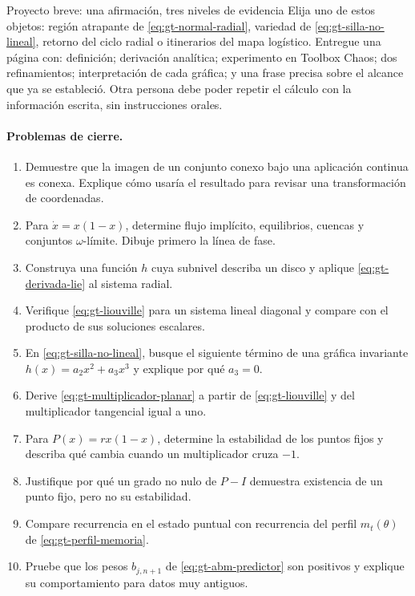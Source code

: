 \begin{activitybox}{Proyecto breve: una afirmación, tres niveles de evidencia}
Elija uno de estos objetos: región atrapante de \eqref{eq:gt-normal-radial}, variedad
de \eqref{eq:gt-silla-no-lineal}, retorno del ciclo radial o itinerarios del mapa
logístico. Entregue una página con: definición; derivación analítica; experimento en
Toolbox Chaos; dos refinamientos; interpretación de cada gráfica; y una frase precisa
sobre el alcance que ya se estableció. Otra persona debe poder repetir el cálculo con
la información escrita, sin instrucciones orales.
\end{activitybox}

\paragraph{Problemas de cierre.}
\begin{enumerate}
  \item Demuestre que la imagen de un conjunto conexo bajo una aplicación continua es
  conexa. Explique cómo usaría el resultado para revisar una transformación de
  coordenadas.
  \item Para $\dot x=x(1-x)$, determine flujo implícito, equilibrios, cuencas y
  conjuntos $\omega$-límite. Dibuje primero la línea de fase.
  \item Construya una función $h$ cuya subnivel describa un disco y aplique
  \eqref{eq:gt-derivada-lie} al sistema radial.
  \item Verifique \eqref{eq:gt-liouville} para un sistema lineal diagonal y compare
  con el producto de sus soluciones escalares.
  \item En \eqref{eq:gt-silla-no-lineal}, busque el siguiente término de una gráfica
  invariante $h(x)=a_2x^2+a_3x^3$ y explique por qué $a_3=0$.
  \item Derive \eqref{eq:gt-multiplicador-planar} a partir de
  \eqref{eq:gt-liouville} y del multiplicador tangencial igual a uno.
  \item Para $P(x)=rx(1-x)$, determine la estabilidad de los puntos fijos y describa
  qué cambia cuando un multiplicador cruza $-1$.
  \item Justifique por qué un grado no nulo de $P-I$ demuestra existencia de un punto
  fijo, pero no su estabilidad.
  \item Compare recurrencia en el estado puntual con recurrencia del perfil
  $m_t(\theta)$ de \eqref{eq:gt-perfil-memoria}.
  \item Pruebe que los pesos $b_{j,n+1}$ de
  \eqref{eq:gt-abm-predictor} son positivos y explique su comportamiento para datos
  muy antiguos.
\end{enumerate}

